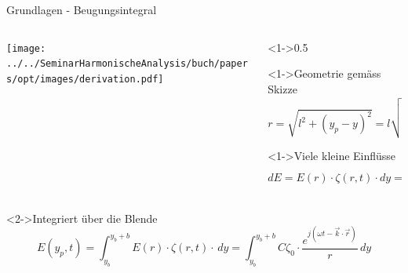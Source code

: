 \begin{frame}{Grundlagen - Beugungsintegral}
    \begin{columns}
        \begin{column}{0.5\textwidth}
            \centering
            \texttt{[image: ../../SeminarHarmonischeAnalysis/buch/papers/opt/images/derivation.pdf]}
        \end{column}

        \begin{column}<1->{0.5\textwidth}
            \begin{block}<1->{Geometrie gemäss Skizze}
                \begin{equation*}
                    r
                    =
                    \sqrt{l^2 + (y_p-y)^2}
                    =
                    l \sqrt{1 + \frac{(y_p-y)^2}{l^2}}
                \end{equation*}
            \end{block}
            \begin{block}<1->{Viele kleine Einflüsse}
                \begin{equation*}
                    dE
                    =
                    E(r) \cdot \zeta(r, t) \cdot dy
                    =
                    \frac{C}{r} \cdot \zeta_0 \cdot e^{j(\omega t - \vec{k}\cdot\vec{r})} \cdot dy
                \end{equation*}
            \end{block}
        \end{column}
    \end{columns}
    \begin{block}<2->{Integriert über die Blende}
        \begin{equation*}
            E(y_p, t)
            =
            \int_{y_b}^{y_b + b} E(r) \cdot \zeta(r, t) \cdot \,dy
            =
            \int_{y_b}^{y_b+b}C\zeta_0 \cdot \frac{e^{j(\omega t - \vec{k}\cdot\vec{r})}}{r} \,dy
            \end{equation*}
    \end{block}
\end{frame}

